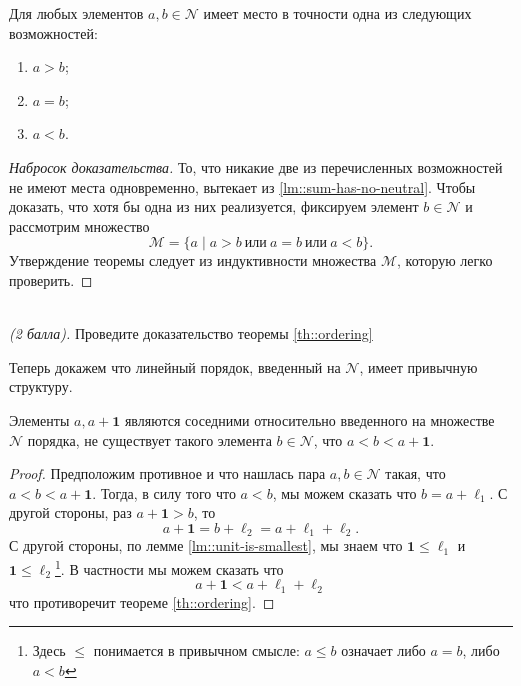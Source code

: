 \documentclass{article}
\begin{document}
\begin{theorem}
    \label{th::ordering}
    Для любых элементов \( a, b \in \mathcal{N} \) имеет место в точности одна из следующих возможностей:
    \begin{enumerate}[noitemsep, topsep=0pt, parsep=0pt]
        \item \( a > b \);
        \item \( a = b \);
        \item \( a < b \).
    \end{enumerate}    
\end{theorem}
\begin{proof}[Набросок доказательства]
    То, что никакие две из перечисленных возможностей не имеют места одновременно, вытекает из \ref{lm::sum-has-no-neutral}. Чтобы доказать, что хотя бы одна из них реализуется, фиксируем элемент \( b \in \mathcal{N} \) и рассмотрим множество
    \[
        \mathcal{M} = \{a \mid a > b \  \text{или} \  a = b \  \text{или} \  a < b\}.
    \]    
    Утверждение теоремы следует из индуктивности множества \( \mathcal{M}\), которую легко проверить.   
\end{proof}
\begin{?}\ \\    
    \textit{(2 балла).} Проведите доказательство теоремы \ref{th::ordering}
\end{?}

Теперь докажем что линейный порядок, введенный на \(\mathcal{N}\), имеет привычную структуру.
\begin{corollary}
    \label{cor::ordering}
    Элементы \( a, a + \mathbf{1} \) являются соседними относительно введенного на множестве \( \mathcal{N} \) порядка, \ie не существует такого элемента \( b \in \mathcal{N} \), что \( a < b < a + \mathbf{1} \).    
\end{corollary}
\begin{proof}
    Предположим противное и что нашлась пара \(a, b \in \mathcal{N}\) такая, что \( a < b < a + \mathbf{1} \). Тогда, в силу того что \(a < b\), мы можем сказать что \(b = a + \ell_1\). С другой стороны, раз \(a + \mathbf{1} > b\), то 
    \[
        a + \mathbf{1} = b + \ell_2 = a + \ell_1 + \ell_2.
    \]
    С другой стороны, по лемме \ref{lm::unit-is-smallest}, мы знаем что \(\mathbf{1} \leq \ell_1\) и \(\mathbf{1} \leq \ell_2\)\footnote{Здесь \(\leq\) понимается в привычном смысле: \(a \leq b\) означает либо \(a = b\), либо \(a < b\)}. В частности мы можем сказать что 
    \[
        a + \mathbf{1} <  a + \ell_1 + \ell_2
    \]
    что противоречит теореме \ref{th::ordering}.
\end{proof}
\end{document}
